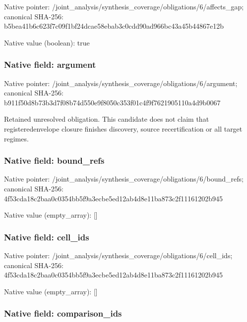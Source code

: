 \documentclass[10pt,a4paper]{article}
\begin{document}
Native pointer: /joint\_analysis/synthesi\allowbreak{}s\_coverage/obligations/6\allowbreak{}/affects\_gap; canonical SHA-256: b5bea41b6c623f7c09f1bf24\allowbreak{}dcae58ebab3c0cdd90ad966b\allowbreak{}c43a45b44867e12b



Native value (boolean): true



\subsubsection{Native field: argument}


Native pointer: /joint\_analysis/synthesi\allowbreak{}s\_coverage/obligations/6\allowbreak{}/argument; canonical SHA-256: b911f50d8b73b3d7f08b74d5\allowbreak{}50e9f8050c353f01c4f9f762\allowbreak{}1905110a4d9b0067


Retained unresolved obligation. This candidate does not claim that registeredenvelope closure finishes discovery, source recertification or all target regimes.


\subsubsection{Native field: bound\_refs}


Native pointer: /joint\_analysis/synthesi\allowbreak{}s\_coverage/obligations/6\allowbreak{}/bound\_refs; canonical SHA-256: 4f53cda18c2baa0c0354bb5f\allowbreak{}9a3ecbe5ed12ab4d8e11ba87\allowbreak{}3c2f11161202b945



Native value (empty\_array): []



\subsubsection{Native field: cell\_ids}


Native pointer: /joint\_analysis/synthesi\allowbreak{}s\_coverage/obligations/6\allowbreak{}/cell\_ids; canonical SHA-256: 4f53cda18c2baa0c0354bb5f\allowbreak{}9a3ecbe5ed12ab4d8e11ba87\allowbreak{}3c2f11161202b945



Native value (empty\_array): []



\subsubsection{Native field: comparison\_ids}
\end{document}
